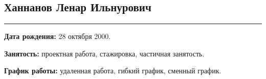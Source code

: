 \documentclass[10pt, final, twoside]{article}
\begin{document}
  \begin{minipage}{0.15\textwidth}\end{minipage}
  \begin{flushright}\section*{\textcolor{darkgray2}{Ханнанов Ленар Ильнурович}}\end{flushright}
  \vspace*{-5.5mm}
  \par\noindent\rule{\textwidth}{0.1pt}
  \textbf{Дата рождения:} 28 октября 2000.
  
  \textbf{Занятость:} проектная работа, стажировка, частичная занятость.
  
  \textbf{График работы:} удаленная работа, гибкий график, сменный график.
\end{document}
